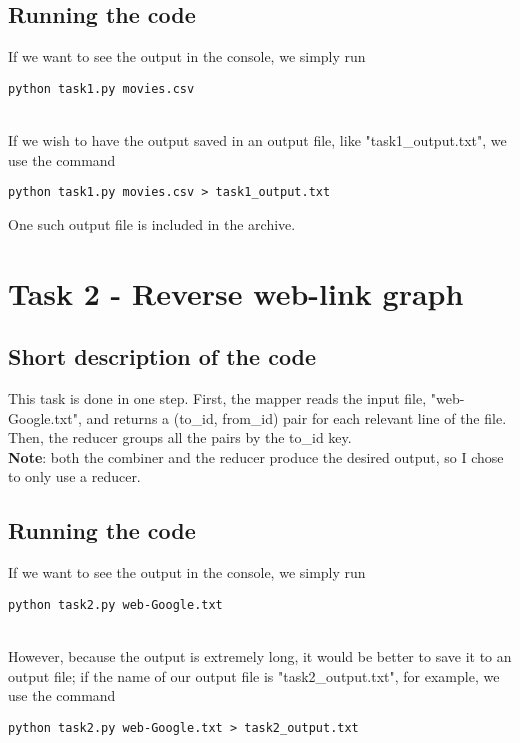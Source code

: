 \documentclass[12pt, a4paper]{article}
\begin{document}
\subsection{Running the code}
If we want to see the output in the console, we simply run \\

\centerline{\texttt{python task1.py movies.csv}}

\noindent\\
If we wish to have the output saved in an output file, like "task1\_output.txt", we use the command \\

\centerline{\texttt{python task1.py movies.csv > task1\_output.txt}}

\hfill 

\noindent
One such output file is included in the archive.


\section{Task 2 - Reverse web-link graph}
\subsection{Short description of the code}
This task is done in one step. First, the mapper reads the input file, "web-Google.txt", and returns a (to\_id, from\_id) pair for each relevant line of the file. Then, the reducer groups all the pairs by the to\_id key.\\

\noindent
\textbf{Note}: both the combiner and the reducer produce the desired output, so I chose to only use a reducer.

\subsection{Running the code}
If we want to see the output in the console, we simply run \\

\centerline{\texttt{python task2.py web-Google.txt}}

\noindent\\
However, because the output is extremely long, it would be better to save it to an output file; if the name of our output file is "task2\_output.txt", for example, we use the command \\

\centerline{\texttt{python task2.py web-Google.txt > task2\_output.txt}}
\end{document}
